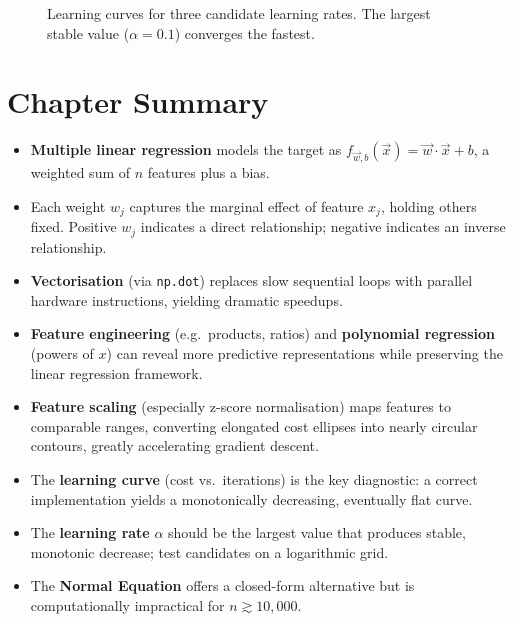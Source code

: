 \begin{figure}[h]
\centering
{}
\caption{Learning curves for three candidate learning rates. The largest stable
value ($\alpha=0.1$) converges the fastest.}
\label{fig:lr-grid}
\end{figure}

\section*{Chapter Summary}

\begin{itemize}
\item \textbf{Multiple linear regression} models the target as
  $f_{\vec{w},b}(\vec{x})=\vec{w}\cdot\vec{x}+b$, a weighted sum of $n$
  features plus a bias.
\item Each weight $w_j$ captures the marginal effect of feature $x_j$,
  holding others fixed. Positive $w_j$ indicates a direct relationship;
  negative indicates an inverse relationship.
\item \textbf{Vectorisation} (via \texttt{np.dot}) replaces slow sequential
  loops with parallel hardware instructions, yielding dramatic speedups.
\item \textbf{Feature engineering} (e.g.\ products, ratios) and
  \textbf{polynomial regression} (powers of $x$) can reveal more predictive
  representations while preserving the linear regression framework.
\item \textbf{Feature scaling} (especially z-score normalisation) maps features
  to comparable ranges, converting elongated cost ellipses into nearly circular
  contours, greatly accelerating gradient descent.
\item The \textbf{learning curve} (cost vs.\ iterations) is the key diagnostic:
  a correct implementation yields a monotonically decreasing, eventually flat
  curve.
\item The \textbf{learning rate} $\alpha$ should be the largest value that
  produces stable, monotonic decrease; test candidates on a logarithmic grid.
\item The \textbf{Normal Equation} offers a closed-form alternative but is
  computationally impractical for $n\gtrsim 10{,}000$.
\end{itemize}
